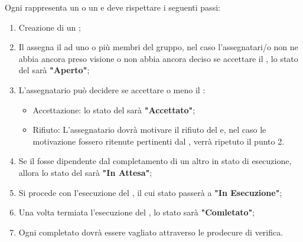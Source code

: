 \documentclass[12pt,a4paper]{article}
\begin{document}
\label{ticketCicloVita}
Ogni \textit{} rappresenta un  o un \textit{} e deve rispettare i seguenti passi:
\begin{enumerate}
	\item Creazione di un \textit{};
	\item Il \PM{} assegna il \textit{} ad uno o più membri del gruppo, nel caso l'assegnatari/o non ne abbia ancora preso visione o non abbia ancora deciso se accettare il \textit{}, lo stato del \textit{} sarà \textbf{"Aperto"};
	\item L'assegnatario può decidere se accettare o meno il \textit{}: 
	\begin{itemize}
		\item Accettazione: lo stato del \textit{} sarà \textbf{"Accettato"};
		\item Rifiuto: L'assegnatario dovrà motivare il rifiuto del \textit{} e, nel caso le motivazione fossero ritenute pertinenti dal \PM{}, verrà ripetuto il punto 2.
	\end{itemize}
	\item Se il \textit{} fosse dipendente dal completamento di un altro \textit{} in stato di esecuzione, allora lo stato del \textit{} sarà \textbf{"In Attesa"};
	\item Si procede con l'esecuzione del \textit{}, il cui stato passerà a \textbf{"In Esecuzione"};
	\item Una volta termiata l'esecuzione del \textit{}, lo stato sarà \textbf{"Comletato"};
	\item Ogni \textit{} completato dovrà essere vagliato attraverso le prodecure di verifica.
\end{enumerate}
\end{document}
